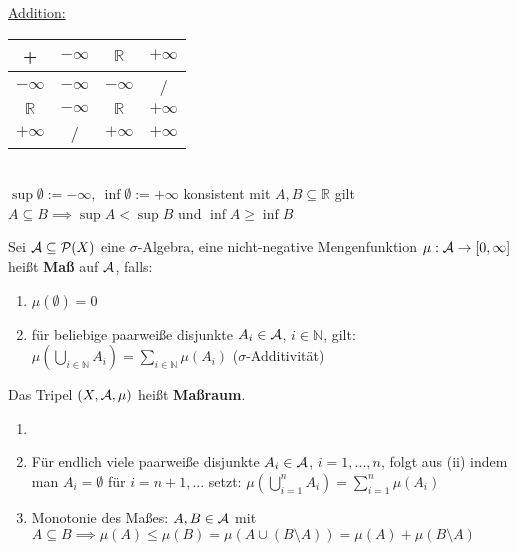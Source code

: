 \documentclass[11pt,a4paper,fleqn,openany]{report}
\begin{document}
    \begin{notation}
      \underline{Addition:}
      \begin{tabular}[t]{c | c c c}
        + & $-\infty$ & $\mathbb{R}$ & $+\infty$\\
        \hline
        $-\infty$ & $-\infty$ & $-\infty$ & /\\
        $\mathbb{R}$ & $-\infty$ & $\mathbb{R}$ & $+\infty$\\
        $+\infty$ & / & $+\infty$ & $+\infty$
      \end{tabular}\\
      $\sup\emptyset := -\infty,\ \inf\emptyset := +\infty$ konsistent mit $A,B \subseteq \mathbb{R}$ gilt $A \subseteq B \implies \sup A < \sup B$ und $\inf A \geq \inf B$ 
    \end{notation}

    \begin{definition}
      Sei $\mathcal{A} \subseteq \mathcal{P}(X)$ eine $\sigma$-Algebra, eine nicht-negative Mengenfunktion $\mu: \mathcal{A} \rightarrow [0, \infty]$ heißt \textbf{Maß} auf $\mathcal{A}$, falls:
      \begin{enumerate}[label=(\roman*)]
        \item $\mu(\emptyset) = 0$
        \item für beliebige paarweiße disjunkte $A_i \in \mathcal{A}$, $i \in \mathbb{N}$, gilt:\\
              $\mu(\bigcup\limits_{i \in \mathbb{N}} A_i) = \sum\limits_{i \in \mathbb{N}} \mu (A_i)$ \hfill ($\sigma$-Additivität)
      \end{enumerate}
      Das Tripel $(X, \mathcal{A}, \mu)$ heißt \textbf{Maßraum}.
    \end{definition}

    \begin{remark}
      \begin{enumerate}
        \item[]
        \item Für endlich viele paarweiße disjunkte $A_i \in \mathcal{A}$, $i=1,...,n$, folgt aus (ii) indem man $A_i=\emptyset$ für $i=n+1, ...$ setzt: $\mu(\bigcup\limits_{i=1}^n A_i) = \sum\limits_{i=1}^n \mu(A_i)$
        \item Monotonie des Maßes: $A,B \in \mathcal{A}$ mit $A \subseteq B \implies \mu(A) \leq \mu(B) = \mu(A \cup (B \setminus A)) = \mu(A) + \mu(B \setminus A)$
      \end{enumerate}
    \end{remark}
\end{document}
